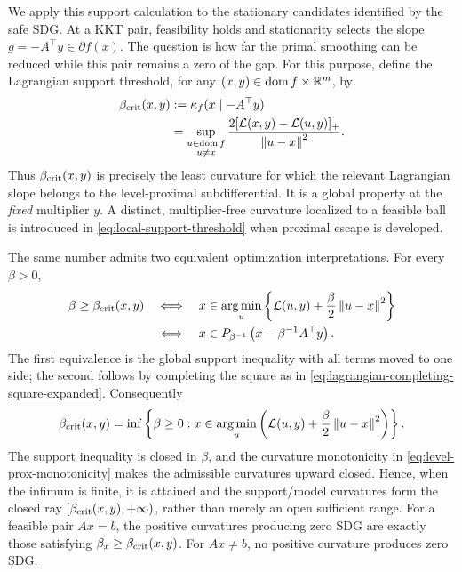 We apply this support calculation to the stationary candidates identified
by the safe SDG.  At a KKT pair, feasibility holds and stationarity selects
the slope \(g=-A^\top y\in\partial f(x)\).  The question is how far the
primal smoothing can be reduced while this pair remains a zero of the gap.
For this purpose, define the Lagrangian support threshold, for any
\((x,y)\in\operatorname{dom}f\times\mathbb{R}^m\), by
\begin{equation}
  \begin{split}
  \beta_{\mathrm{crit}}(x,y)
  &:=
  \kappa_f(x\mid-A^\top y)\\
  &=
  \sup_{\substack{u\in\operatorname{dom}f\\u\ne x}}
  \frac{2[\mathcal{L}(x,y)-\mathcal{L}(u,y)]_+}{\left\lVert u-x\right\rVert^2}.
  \end{split}
  \label{eq:beta-crit}
\end{equation}
Thus \(\beta_{\mathrm{crit}}(x,y)\) is precisely the least curvature for which the
relevant Lagrangian slope belongs to the level-proximal subdifferential.  It
is a global property at the \emph{fixed} multiplier \(y\).  A distinct,
multiplier-free curvature localized to a feasible ball is introduced in
\cref{eq:local-support-threshold} when proximal escape is developed.

The same number admits two equivalent optimization interpretations.  For
every \(\beta>0\),
\begin{equation}
  \begin{split}
  \beta\ge\beta_{\mathrm{crit}}(x,y)
  &\quad\Longleftrightarrow\quad
  x\in\operatorname*{arg\,min}_u
  \left\{
    \mathcal{L}(u,y)+\frac{\beta}{2}\left\lVert u-x\right\rVert^{2}
  \right\}\\
  &\quad\Longleftrightarrow\quad
  x\in
  P_{\beta^{-1}}
  \left(x-\beta^{-1}A^\top y\right).
  \end{split}
  \label{eq:beta-crit-equivalent-models}
\end{equation}
The first equivalence is the global support inequality with all terms moved
to one side; the second follows by completing the square as in
\cref{eq:lagrangian-completing-square-expanded}.  Consequently
\begin{equation}
  \beta_{\mathrm{crit}}(x,y)
  =
  \inf\left\{
    \beta\ge0:
    x\in\operatorname*{arg\,min}_u
      \left(\mathcal{L}(u,y)+\frac{\beta}{2}\left\lVert u-x\right\rVert^{2}\right)
  \right\}.
  \label{eq:beta-crit-model-infimum}
\end{equation}
The support inequality is closed in \(\beta\), and the curvature monotonicity
in \cref{eq:level-prox-monotonicity} makes the admissible curvatures upward
closed.  Hence, when the infimum is finite, it is attained and the
support/model curvatures form the closed ray
\([\beta_{\mathrm{crit}}(x,y),+\infty)\), rather than merely an open sufficient
range.  For a feasible pair \(Ax=b\), the positive curvatures producing
zero SDG are exactly those satisfying \(\beta_x\ge\beta_{\mathrm{crit}}(x,y)\).
For \(Ax\ne b\), no positive curvature produces zero SDG.

